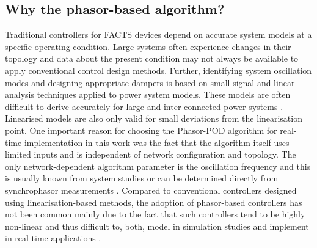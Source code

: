 \documentclass[journal]{IEEEtran}
\begin{document}

\subsection{Why the phasor-based algorithm?}  %
Traditional controllers for FACTS devices depend on accurate system models at a specific operating condition. Large systems often experience changes in their topology and data about the present condition may not always be available to apply conventional control design methods. Further, identifying system oscillation modes and designing appropriate dampers is based on small signal and linear analysis techniques applied to power system models. These models are often difficult to derive accurately for large and inter-connected power systems \cite{WAMTCSC}. Linearised models are also only valid for small deviations from the linearisation point. One important reason for choosing the Phasor-POD algorithm for real-time implementation in this work was the fact that the algorithm itself uses limited inputs and is independent of network configuration and topology. The only network-dependent algorithm parameter is the oscillation frequency and this is usually known from system studies or can be determined directly from synchrophasor measurements \cite{TaskForce}. Compared to conventional controllers designed using linearisation-based methods, the adoption of phasor-based controllers has not been common mainly due to the fact that such controllers tend to be highly non-linear and thus difficult to, both, model in simulation studies \cite{Chaudhuri} and implement in real-time applications \cite{WAPODNorway}.
\end{document}

